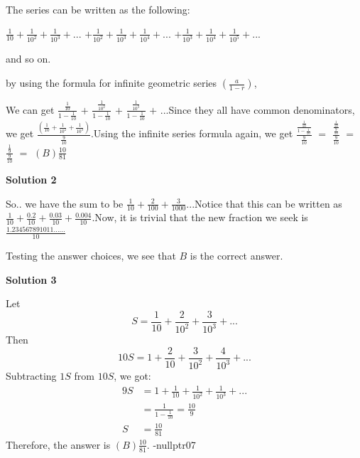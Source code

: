 \begin{enumerate}
The series can be written as the following:

 $\frac{1}{10} + \frac{1}{10^2} + \frac{1}{10^3} + ...$
$+ \frac{1}{10^2} + \frac{1}{10^3} + \frac{1}{10^4} + ...$
$+ \frac{1}{10^3} + \frac{1}{10^4} + \frac{1}{10^5} + ...$

 and so on.

 by using the formula for infinite geometric series $(\frac{a}{1-r})$,

 We can get $\frac{\frac{1}{10}}{1-\frac{1}{10}}$ $+$ $\frac{\frac{1}{10^2}}{1-\frac{1}{10}}$ $+$ $\frac{\frac{1}{10^3}}{1-\frac{1}{10}}$ $+$ ...Since they all have common denominators, we get $\frac{(\frac{1}{10} + \frac{1}{10^2} + \frac{1}{10^3})}{\frac{9}{10}}$.Using the infinite series formula again, we get $\frac{\frac{\frac{1}{10}}{1-\frac{1}{10}}}{\frac{9}{10}}$ $=$ $\frac{\frac{\frac{1}{10}}{\frac{9}{10}}}{\frac{9}{10}}$ $=$ $\frac{\frac{1}{9}}{\frac{9}{10}}$ $=$ $\boxed{ (B) \frac{10}{81}}$




\textbf{Solution 2}

So.. we have the sum to be $\frac{1}{10}+\frac{2}{100}+\frac{3}{1000}$...Notice that this can be written as $\frac{1}{10}+\frac{0.2}{10}+\frac{0.03}{10}+\frac{0.004}{10}$.Now, it is trivial that the new fraction we seek is $\frac{1.234567891011......}{10}$

 Testing the answer choices, we see that $\boxed{B}$ is the correct answer.

 



\textbf{Solution 3}

Let
 \[S = \frac{1}{10} + \frac{2}{10^2} + \frac{3}{10^3} + ...\]Then
 \[10S = 1 + \frac{2}{10} + \frac{3}{10^2} + \frac{4}{10^3} + ...\]Subtracting $1S$ from $10S$, we got:
 \begin{align*} 9S &= 1 + \frac{1}{10} + \frac{1}{10^2} + \frac{1}{10^3} + ... \\ &= \frac{1}{1-\frac{1}{10}} = \frac{10}{9} \\ S &= \frac{10}{81} \end{align*}
Therefore, the answer is $\boxed{(B) \frac{10}{81}}$. -nullptr07

 


\end{enumerate}
